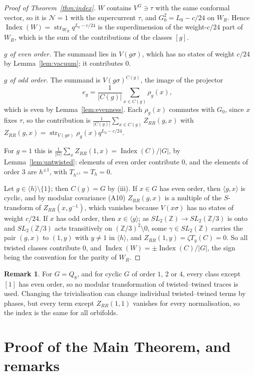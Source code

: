 \documentclass[11pt]{amsart}
\theoremstyle{definition}
\newtheorem{remark}[theorem]{Remark}
\newcommand{\Z}{\mathbb{Z}}
\newcommand{\cN}{\mathcal N}
\newcommand{\Index}{\operatorname{Index}}
\newcommand{\str}{\operatorname{str}}
\begin{document}
\begin{proof}[Proof of Theorem~\ref{thm:index}]
$W$ contains $V^G\ni\tau$ with the same conformal vector, so it is $\cN=1$ with the supercurrent $\tau$,
and $G_0^2=L_0-c/24$ on $W_R$. Hence $\Index(W)=\str_{W_R}q^{L_0-c/24}$ is the superdimension of the
weight-$c/24$ part of $W_R$, which is the sum of the contributions of the classes $[g]$.

\emph{$g$ of even order.} The summand lies in $V(g\sigma)$, which has no states of weight $c/24$ by
Lemma~\ref{lem:vacuum}; it contributes $0$.

\emph{$g$ of odd order.} The summand is $V(g\sigma)^{C(g)}$, the image of the projector
\[
  e_g=\frac1{|C(g)|}\sum_{x\in C(g)}\rho_g(x),
\]
which is even by Lemma~\ref{lem:evenness}. Each $\rho_g(x)$ commutes with $G_0$,
since $x$ fixes $\tau$, so the contribution is $\frac1{|C(g)|}\sum_{x\in C(g)}Z_{RR}(g,x)$ with
$Z_{RR}(g,x)=\str_{V(g\sigma)}\rho_g(x)q^{L_0-c/24}$.

For $g=1$ this is $\frac1{|G|}\sum_xZ_{RR}(1,x)=\Index(C)/|G|$, by Lemma~\ref{lem:untwisted}: elements of
even order contribute $0$, and the elements of order $3$ are $h^{\pm1}$, with $T_{h^{\pm1}}=T_h=0$.

Let $g\in\langle h\rangle\setminus\{1\}$; then $C(g)=G$ by (iii). If $x\in G$ has even order, then
$\langle g,x\rangle$ is cyclic, and by modular covariance (A10) $Z_{RR}(g,x)$ is a multiple of the
$S$-transform of $Z_{RR}(x,g^{-1})$, which vanishes because $V(x\sigma)$ has no states of weight $c/24$.
If $x$ has odd order, then $x\in\langle g\rangle$; as $SL_2(\Z)\to SL_2(\Z/3)$ is onto and $SL_2(\Z/3)$
acts transitively on $(\Z/3)^2\setminus0$, some $\gamma\in SL_2(\Z)$ carries the pair $(g,x)$ to $(1,y)$
with $y\ne1$ in $\langle h\rangle$, and $Z_{RR}(1,y)=\zeta T_y(C)=0$. So all twisted classes contribute
$0$, and $\Index(W)=\pm\Index(C)/|G|$, the sign being the convention for the parity of $W_R$.
\end{proof}

\begin{remark}
For $G=Q_8$, and for cyclic $G$ of order $1$, $2$ or $4$, every class except $[1]$ has even order, so no
modular transformation of twisted--twined traces is used. Changing the trivialisation can change
individual twisted--twined terms by phases, but every term except $Z_{RR}(1,1)$ vanishes for every
normalisation, so the index is the same for all orbifolds.
\end{remark}

\section{Proof of the Main Theorem, and remarks}\label{sec:proof}
\end{document}
